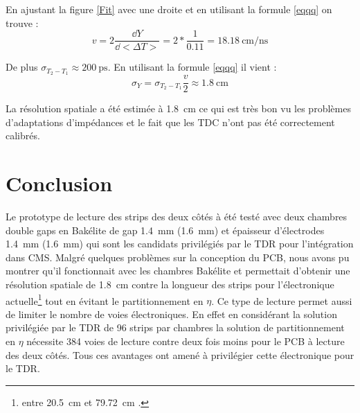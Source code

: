 En ajustant la figure \ref{Fit} avec une droite et en utilisant la formule \ref{eqqq} on trouve :
\begin{equation}
v=2\frac{\dd Y}{\dd <\Delta T>}=2*\frac{1}{0.11}=\SI{18.18}{\centi\meter\per\nano\second}
\end{equation}

De plus $\sigma_{T_2-T_1}\approx\SI{200}{\pico\second}$. En utilisant la formule \ref{eqqq} il vient :
\begin{equation}
\sigma_{Y}=\sigma_{T_2-T_1}\frac{v}{2}\approx\SI{1.8}{\centi\meter}
\end{equation}

La résolution spatiale a été estimée à \SI{1.8}{\centi\meter} ce qui est très bon vu les problèmes d'adaptations d'impédances et le fait que les TDC n'ont pas été correctement calibrés.

\section{Conclusion}
Le prototype de lecture des strips des deux côtés à été testé avec deux chambres double gaps en Bakélite de gap \SI{1.4}{\milli\meter} (\SI{1.6}{\milli\meter}) et épaisseur d'électrodes \SI{1.4}{\milli\meter} (\SI{1.6}{\milli\meter}) qui sont les candidats privilégiés par le TDR pour l'intégration dans CMS. Malgré quelques problèmes sur la conception du PCB, nous avons pu montrer qu'il fonctionnait avec les chambres Bakélite et permettait d'obtenir une résolution spatiale de \SI{1.8}{\centi\meter} contre la longueur des strips pour l'électronique actuelle\footnote{entre \SI{20.5}{\centi\meter} et \SI{79.72}{\centi\meter} \cite{gapss}.} tout en évitant le partitionnement en $\eta$. Ce type de lecture permet aussi de limiter le nombre de voies électroniques. En effet en considérant la solution privilégiée par le TDR de \num{96} strips par chambres la solution de partitionnement en $\eta$ nécessite \num{384} voies de lecture contre deux fois moins pour le PCB à lecture des deux côtés. Tous ces avantages ont amené à privilégier cette électronique pour le TDR.